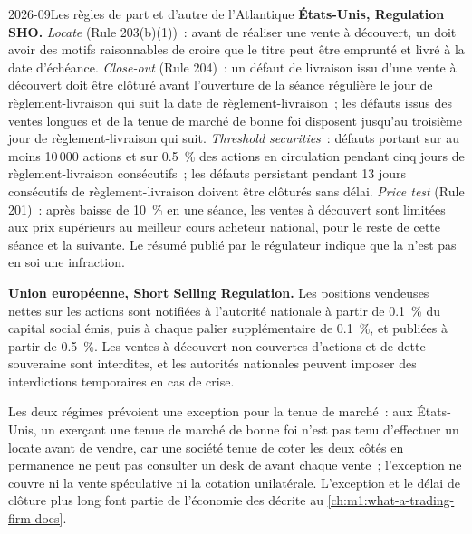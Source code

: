 \begin{dated}{2026-09}{Les règles de part et d'autre de l'Atlantique}\label{dat:m1:stock-loan-and-short-selling:rules}
\textbf{États-Unis, Regulation SHO.} \emph{Locate} (Rule 203(b)(1))~: avant
de réaliser une vente à découvert, un  doit avoir des motifs raisonnables de
croire que le titre peut être emprunté et livré à la date d'échéance.
\emph{Close-out} (Rule 204)~: un défaut de livraison issu d'une vente à découvert doit être clôturé avant
l'ouverture de la séance régulière le jour de règlement-livraison qui suit la
date de règlement-livraison~; les défauts issus des ventes longues et de la tenue de marché de bonne foi disposent
jusqu'au troisième jour de règlement-livraison qui suit. \emph{Threshold securities}~:
défauts portant sur au moins 10\,000 actions et sur 0.5~\% des actions en circulation pendant cinq
jours de règlement-livraison consécutifs~; les défauts persistant pendant 13 jours
consécutifs de règlement-livraison doivent être clôturés sans délai. \emph{Price test} (Rule 201)~: après
baisse de 10~\% en une séance, les ventes à découvert sont limitées aux prix supérieurs au
meilleur cours acheteur national, pour le reste de cette séance et la suivante.
Le résumé publié par le régulateur indique que la  n'est pas en soi une infraction.

\textbf{Union européenne, Short Selling Regulation.} Les positions vendeuses nettes sur
les actions sont notifiées à l'autorité nationale à partir de 0.1~\% du capital
social émis, puis à chaque palier supplémentaire de 0.1~\%, et publiées à partir de 0.5~\%.
Les ventes à découvert non couvertes d'actions et de dette souveraine sont interdites, et les
autorités nationales peuvent imposer des interdictions temporaires en cas de crise.
\end{dated}

Les deux régimes prévoient une exception pour la tenue de marché~: aux États-Unis, un
 exerçant une tenue de marché de bonne foi n'est pas tenu d'effectuer un locate
avant de vendre, car une société tenue de coter les deux côtés en permanence ne peut pas
consulter un desk de  avant chaque vente~; l'exception ne couvre ni la
vente spéculative ni la cotation unilatérale. L'exception et le délai de clôture plus long font
partie de l'économie des  décrite au
\cref{ch:m1:what-a-trading-firm-does}.

